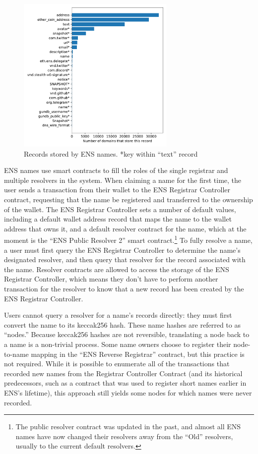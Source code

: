 \begin{figure}[t]
	\centering
	\includegraphics[width=3in]{figs/ens_names.pdf}
	\caption{Records stored by ENS names. *key within ``text'' record}
	\label{fig:ens_records}
\end{figure}

ENS names use smart contracts to fill the roles of the single registrar and 
multiple resolvers in the system. When claiming a name for the first 
time, the user sends a transaction from their wallet to the ENS Registrar 
Controller 
contract, requesting that the name be registered and transferred to the 
ownership of the wallet. The ENS Registrar Controller sets a number of default 
values, including a default wallet 
address record that maps the name to the wallet address that owns it, and a 
default resolver contract for the 
name, which at the moment is the ``ENS Public Resolver 2'' smart 
contract.\footnote{The public 
	resolver contract was updated in the past, and almost all ENS names have 
	now 
	changed their resolvers away
	from the ``Old'' resolvers, usually to the current default resolvers.} To 
	fully 
resolve a 
name, a user must first query the ENS Registrar Controller to determine the 
name's designated resolver, and then query that resolver for the record 
associated with the name. Resolver contracts are allowed to access the storage 
of the ENS Registrar Controller, which means they don't have to perform another 
transaction for the resolver to know that a new record has been created by the 
ENS Registrar Controller. 

Users cannot query a resolver for a name's records directly: they must first 
convert the name to its keccak256 hash. These 
name hashes are referred to as ``nodes.'' Because keccak256 hashes are not 
reversible, 
translating a node back to a name is a non-trivial process. Some name owners 
choose to register their node-to-name mapping in the ``ENS Reverse Registrar'' 
contract, but this practice is not required. While it is possible to enumerate 
all of the transactions that recorded new names from the Registrar Controller 
Contract (and its historical predecessors, such as a contract that was used to 
register short names earlier in ENS's lifetime), this approach still yields some
nodes for which names were never recorded. 

